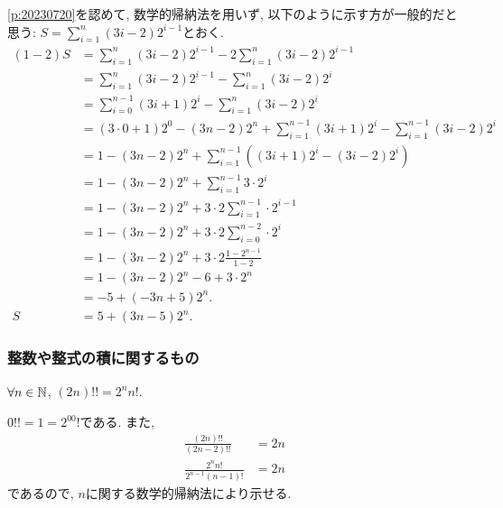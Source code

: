 \begin{rem}
  \cref{p:20230720}を認めて,
  数学的帰納法を用いず, 以下のように示す方が一般的だと思う:
  $S=\sum_{i=1}^n (3i-2)2^{i-1}$とおく.
  \begin{align*}
    (1-2)S
    &=\sum_{i=1}^n (3i-2)2^{i-1}-2\sum_{i=1}^n (3i-2)2^{i-1}\\
    &=\sum_{i=1}^n (3i-2)2^{i-1}-\sum_{i=1}^n (3i-2)2^{i}\\
    &=\sum_{i=0}^{n-1} (3i+1)2^{i}-\sum_{i=1}^n (3i-2)2^{i}\\
    &=(3\cdot0+1)2^{0}-(3n-2)2^{n}+\sum_{i=1}^{n-1} (3i+1)2^{i}-\sum_{i=1}^{n-1} (3i-2)2^{i}\\
    &=1-(3n-2)2^{n}+\sum_{i=1}^{n-1} ((3i+1)2^{i}-(3i-2)2^{i})\\
    &=1-(3n-2)2^{n}+\sum_{i=1}^{n-1}3\cdot 2^{i}\\
    &=1-(3n-2)2^{n}+3\cdot 2\sum_{i=1}^{n-1}\cdot 2^{i-1}\\
    &=1-(3n-2)2^{n}+3\cdot 2\sum_{i=0}^{n-2}\cdot 2^{i}\\
    &=1-(3n-2)2^{n}+3\cdot 2\frac{1-2^{n-1}}{1-2}\\
    &=1-(3n-2)2^{n}-6+3\cdot 2^{n}\\
    &=-5+(-3n+5)2^{n}.\\
    S&=5+(3n-5)2^{n}.
  \end{align*}
\end{rem}


\subsubsection{整数や整式の積に関するもの}
\begin{prop}
  \label{p:20230723}
  $\forall n\in \mathbb{N}$,
  $(2n)!!=2^nn!$.
\end{prop}

\begin{proof**}
  $0!!=1=2^00!$である.
  また,
  \begin{align*}
    \frac{(2n)!!}{(2n-2)!!}&=2n\\
    \frac{2^nn!}{2^{n-1}(n-1)!}&=2n
  \end{align*}
  であるので,
  $n$に関する数学的帰納法により示せる.
\end{proof**}


